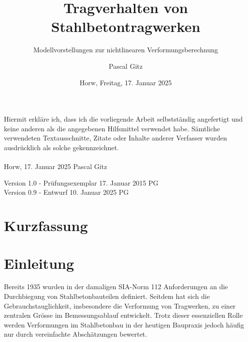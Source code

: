 \documentclass[
  11pt,
  letterpaper,
]{scrreprt}
\title{Tragverhalten von Stahlbetontragwerken}
\subtitle
{Modellvorstellungen zur nichtlinearen Verformungsberechnung}
\date{\large Horw, Freitag, 17. Januar 2025}
\author{Pascal Gitz}
\renewcommand*\contentsname{Inhaltsverzeichnis}
\newcommand\contentsname{Inhaltsverzeichnis}
\begin{document}
\maketitle


Hiermit erkläre ich, dass ich die vorliegende Arbeit selbstständig angefertigt und keine anderen als die angegebenen Hilfsmittel verwendet habe. Sämtliche verwendeten Textausschnitte, Zitate oder Inhalte anderer Verfasser wurden ausdrücklich als solche gekennzeichnet.\\%
%
\\%
%
Horw, 17. Januar 2025 \hfill Pascal Gitz%

\vfill

Version 1.0 - Prüfungsexemplar \hfill 17. Januar 2015 \quad \quad \quad \quad \quad PG\\
Version 0.9 - Entwurf \hfill 10. Januar 2025 \quad \quad \quad \quad \quad PG\\

\newpage

\chapter*{Kurzfassung}


\renewcommand*\contentsname{Inhaltsverzeichnis}
{
\hypersetup{linkcolor=}
\setcounter{tocdepth}{1}
\tableofcontents
}
\listoffigures


\chapter{Einleitung}\label{einleitung}

Bereits 1935 wurden in der damaligen SIA-Norm 112 Anforderungen an die
Durchbiegung von Stahlbetonbauteilen definiert. Seitdem hat sich die
Gebrauchstauglichkeit, insbesondere die Verformung von Tragwerken, zu
einer zentralen Grösse im Bemessungsablauf entwickelt. Trotz dieser
essenziellen Rolle werden Verformungen im Stahlbetonbau in der heutigen
Baupraxis jedoch häufig nur durch vereinfachte Abschätzungen bewertet.
\end{document}
